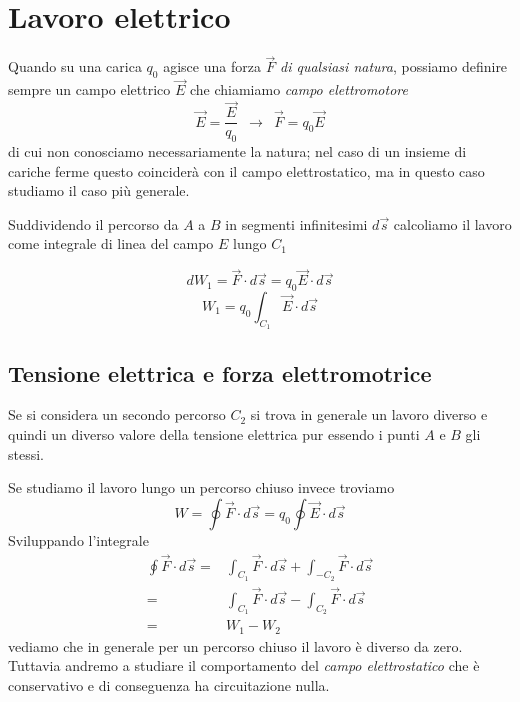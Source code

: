 \documentclass[x11names]{report}
\begin{document}
\section{Lavoro elettrico}
Quando su una carica \(q_0\) agisce una forza \(\vec{F}\) \textit{di qualsiasi natura}, possiamo definire sempre un campo elettrico \(\vec{E}\) che chiamiamo \textit{campo elettromotore}
\[
\vec{E} = \frac{\vec{E}}{q_0} \;\ \to \;\ \vec{F} = q_0 \vec{E}
\]
di cui non conosciamo necessariamente la natura; nel caso di un insieme di cariche ferme questo coinciderà con il campo elettrostatico, ma in questo caso studiamo il caso più generale.

Suddividendo il percorso da \(A\) a \(B\) in segmenti infinitesimi \(d\vec{s}\) calcoliamo il lavoro come integrale di linea del campo \(E\) lungo \(C_1\) 
\begin{figure}[h]
	\centering
\end{figure}

\[
dW_1 = \vec{F}\cdot d\vec{s} = q_0\vec{E} \cdot d\vec{s}
\]
\[
 W_1 =  q_0 \int_{C_1} \vec{E} \cdot d\vec{s}
\]

\subsection{Tensione elettrica e forza elettromotrice}
Se si considera un secondo percorso \(C_2\) si trova in generale un lavoro diverso e quindi un diverso valore della tensione elettrica pur essendo i punti \(A\) e \(B\) gli stessi.


Se studiamo il lavoro lungo un percorso chiuso invece troviamo
\[
W = \oint \vec{F} \cdot d\vec{s} = q_0\oint\vec{E}\cdot d\vec{s}
\]
Sviluppando l'integrale
\begin{align*}
	\oint\vec{F}\cdot d\vec{s} =& \int_{C_1}\vec{F}\cdot d\vec{s} + \int_{-C_2}\vec{F}\cdot d\vec{s} \\
							   =& \int_{C_1}\vec{F}\cdot d\vec{s} - \int_{C_2}\vec{F}\cdot d\vec{s} \\
							   =& W_1 - W_2
\end{align*}
vediamo che in generale per un percorso chiuso il lavoro è diverso da zero. Tuttavia andremo a studiare il comportamento del \textit{campo elettrostatico} che è conservativo e di conseguenza ha circuitazione nulla. 
\end{document}

